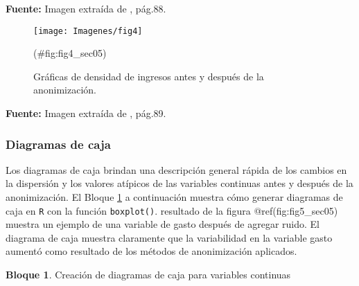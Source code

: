\documentclass[
]{book}
\newenvironment{Shaded}{\begin{snugshade}}{\end{snugshade}}
\newcommand{\AttributeTok}[1]{\textcolor[rgb]{0.77,0.63,0.00}{#1}}
\newcommand{\DecValTok}[1]{\textcolor[rgb]{0.00,0.00,0.81}{#1}}
\newcommand{\FunctionTok}[1]{\textcolor[rgb]{0.00,0.00,0.00}{#1}}
\newcommand{\NormalTok}[1]{#1}
\newcommand{\SpecialCharTok}[1]{\textcolor[rgb]{0.00,0.00,0.00}{#1}}
\newcommand{\StringTok}[1]{\textcolor[rgb]{0.31,0.60,0.02}{#1}}
\theoremstyle{definition}
\theoremstyle{definition}
\newtheorem{example}{Bloque}[chapter]
\theoremstyle{definition}
\theoremstyle{definition}
\theoremstyle{remark}
\begin{document}
\textbf{Fuente:} Imagen extraída de \citep{benschop2021}, pág.88.

\begin{figure}

{\centering \texttt{[image: Imagenes/fig4]} 

}

\caption{Gráficas de densidad de ingresos antes y después de la anonimización.}(\#fig:fig4_sec05)
\end{figure}

\textbf{Fuente:} Imagen extraída de \citep{benschop2021}, pág.89.

\hypertarget{diagramas-de-caja}{%
\subsubsection{Diagramas de caja}\label{diagramas-de-caja}}

Los diagramas de caja brindan una descripción general rápida de los cambios en la dispersión y los valores atípicos de las variables continuas antes y después de la anonimización. El Bloque \ref{exm:bloque12lbn} a continuación muestra cómo generar diagramas de caja en \texttt{R} con la función \texttt{boxplot()}. resultado de la figura
@ref(fig:fig5\_sec05) muestra un ejemplo de una variable de gasto después de agregar ruido. El diagrama de caja muestra claramente que la variabilidad en la variable gasto aumentó como resultado de los métodos de anonimización aplicados.

\begin{example}
\protect\hypertarget{exm:bloque12lbn}{}\label{exm:bloque12lbn}Creación de diagramas de caja para variables continuas
\end{example}

\begin{Shaded}
\end{Shaded}
\end{document}

